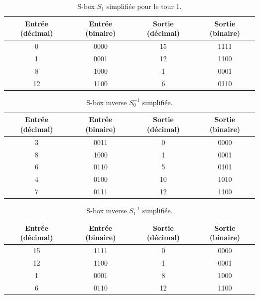 \documentclass[12pt,a4paper]{report}
\begin{document}
\begin{table}[h]
    \centering
    \begin{tabular}{|c|c|c|c|}
        \hline
        Entrée (décimal) & Entrée (binaire) & Sortie (décimal) & Sortie (binaire) \\
        \hline
        0 & 0000 & 15 & 1111 \\
        1 & 0001 & 12 & 1100 \\
        8 & 1000 & 1 & 0001 \\
        12 & 1100 & 6 & 0110 \\
        \hline
    \end{tabular}
    \caption{S-box \( S_1 \) simplifiée pour le tour 1.}
    \label{tab:sbox1}
\end{table}

\begin{table}[h]
    \centering
    \begin{tabular}{|c|c|c|c|}
        \hline
        Entrée (décimal) & Entrée (binaire) & Sortie (décimal) & Sortie (binaire) \\
        \hline
        3 & 0011 & 0 & 0000 \\
        8 & 1000 & 1 & 0001 \\
        6 & 0110 & 5 & 0101 \\
        4 & 0100 & 10 & 1010 \\
        7 & 0111 & 12 & 1100 \\
        \hline
    \end{tabular}
    \caption{S-box inverse \( S_0^{-1} \) simplifiée.}
    \label{tab:sbox0_inv}
\end{table}

\begin{table}[h]
    \centering
    \begin{tabular}{|c|c|c|c|}
        \hline
        Entrée (décimal) & Entrée (binaire) & Sortie (décimal) & Sortie (binaire) \\
        \hline
        15 & 1111 & 0 & 0000 \\
        12 & 1100 & 1 & 0001 \\
        1 & 0001 & 8 & 1000 \\
        6 & 0110 & 12 & 1100 \\
        \hline
    \end{tabular}
    \caption{S-box inverse \( S_1^{-1} \) simplifiée.}
    \label{tab:sbox1_inv}
\end{table}
\end{document}
